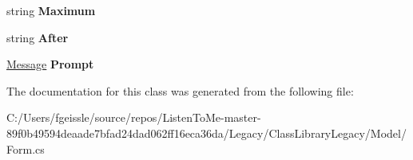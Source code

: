 \begin{DoxyCompactItemize}
string {\bfseries Maximum}
\item 
\mbox{\label{class_class_library_1_1model_1_1_property_a27b8eb9c69a9549bc260c0b07c597bff}} 
string {\bfseries After}
\item 
\mbox{\label{class_class_library_1_1model_1_1_property_a1bc3ae48e9702507524847cb670f47b0}} 
\mbox{\hyperlink{class_class_library_1_1model_1_1_message}{Message}} {\bfseries Prompt}
\end{DoxyCompactItemize}


The documentation for this class was generated from the following file\+:\begin{DoxyCompactItemize}
\item 
C\+:/\+Users/fgeissle/source/repos/\+Listen\+To\+Me-\/master-\/89f0b49594deaade7bfad24dad062ff16eca36da/\+Legacy/\+Class\+Library\+Legacy/\+Model/Form.\+cs\end{DoxyCompactItemize}
